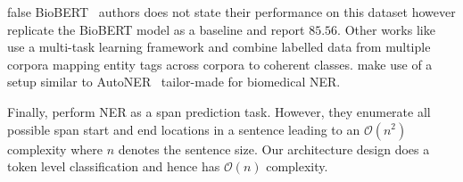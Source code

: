 \if false
BioBERT~\cite{lee2020biobert} authors does not state their performance on this dataset however \cite{banerjee2019knowledge} replicate the BioBERT model as a baseline and report $85.56$. Other works like \cite{wang2019cross} use a multi-task learning framework and combine labelled data from multiple corpora mapping entity tags across corpora to coherent classes. \cite{wang2019distantly} make use of a setup similar to AutoNER~\cite{shang2018learning} tailor-made for biomedical NER. 
\fi 

Finally, \cite{li2020MRC,Jiang20,Ouchi20} perform NER as a span prediction task. However, they enumerate all possible span start and end locations in a sentence leading to an $\mathcal{O}(n^2)$ complexity where $n$ denotes the sentence size. Our architecture design does a token level classification and hence has $\mathcal{O}(n)$ complexity.
